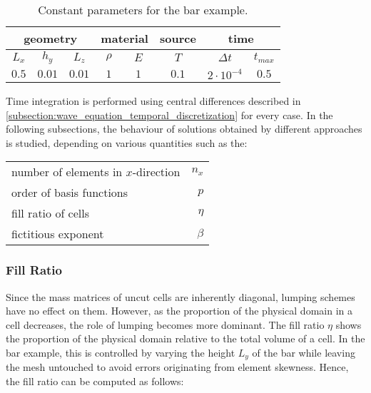 \begin{table}[h]
	\centering
	\bgroup
	\def\arraystretch{1.5}
	\begin{tabular}{|c|c|c|c|c|c|c|c|}
		\hline
		\multicolumn{3}{|c}{geometry} & \multicolumn{2}{|c}{material} & \multicolumn{1}{|c}{source} & \multicolumn{2}{|c|}{time} \\
		\hline \hline
		$L_x$ & $h_y$ & $L_z$ & $\rho$ & $E$ & $T$ & $\Delta t$ & $t_{max}$ \\
		\hline
		$0.5$ & $0.01$ & $0.01$ & $1$ & $1$ & $0.1$ & $2\cdot 10^{-4}$ & $0.5$ \\
		\hline
	\end{tabular}
	\egroup
	\caption{Constant parameters for the bar example.}
\end{table}

Time integration is performed using central differences described in \ref{subsection:wave_equation_temporal_discretization} for every case. In the following subsections, the behaviour of solutions obtained by different approaches is studied, depending on various quantities such as the:

\begin{tabular}{>{\textbullet\hspace{\labelsep}}lr}
	number of elements in $x$-direction & $n_x$ \\
	order of basis functions & $p$ \\
	fill ratio of cells & $\eta$ \\
	fictitious exponent & $\beta$
\end{tabular}\bigskip

\subsubsection*{Fill Ratio}
\label{section:fill_ratio}

Since the mass matrices of uncut cells are inherently diagonal, lumping schemes have no effect on them. However, as the proportion of the physical domain in a cell decreases, the role of lumping becomes more dominant. The fill ratio $\eta$ shows the proportion of the physical domain relative to the total volume of a cell. In the bar example, this is controlled by varying the height $L_y$ of the bar while leaving the mesh untouched to avoid errors originating from element skewness. Hence, the fill ratio can be computed as follows:

